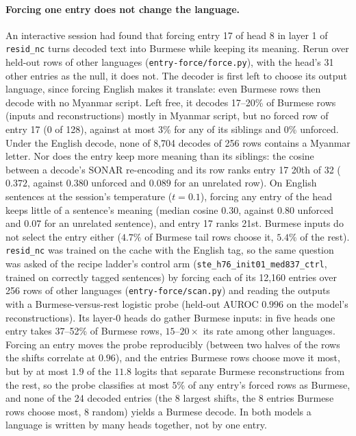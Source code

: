\paragraph{Forcing one entry does not change the language.}
\label{sec:entryforce}
An interactive session had found that forcing entry 17 of head 8 in
layer 1 of \texttt{resid\_nc} turns decoded text into Burmese while
keeping its meaning. Rerun over held-out rows of other languages
(\texttt{entry-force/force.py}), with the head's 31 other entries as the
null, it does not. The decoder is first left to choose its output
language, since forcing English makes it translate: even Burmese rows then
decode with no Myanmar script. Left free, it decodes 17--20\% of Burmese
rows (inputs and reconstructions) mostly in Myanmar script, but no forced
row of entry 17 (0 of 128), against at most 3\% for any of its siblings and
0\% unforced. Under the English decode, none of 8{,}704 decodes of 256
rows contains a Myanmar letter. Nor does the entry keep more meaning than
its siblings: the cosine between a decode's SONAR re-encoding and its row
ranks entry 17 20th of 32 ($0.372$, against $0.380$ unforced and $0.089$
for an unrelated row). On English sentences at the session's temperature
($t{=}0.1$), forcing any entry of the head keeps little of a sentence's
meaning (median cosine $0.30$, against $0.80$ unforced and $0.07$ for an
unrelated sentence), and entry 17 ranks 21st. Burmese inputs do not
select the entry either ($4.7\%$ of Burmese tail rows choose it, $5.4\%$
of the rest). \texttt{resid\_nc} was trained on the cache with the English
tag, so the same question was asked of the recipe ladder's control arm
(\texttt{ste\_h76\_init01\_med837\_ctrl}, trained on correctly tagged
sentences) by forcing each of its 12{,}160 entries over 256 rows of other
languages (\texttt{entry-force/scan.py}) and reading the outputs with a
Burmese-versus-rest logistic probe (held-out AUROC $0.996$ on the model's
reconstructions). Its layer-0 heads do gather Burmese inputs: in five
heads one entry takes 37--52\% of Burmese rows, $15$--$20{\times}$ its
rate among other languages. Forcing an entry moves the probe
reproducibly (between two halves of the rows the shifts correlate at
$0.96$), and the entries Burmese rows choose move it most, but by at most
$1.9$ of the $11.8$ logits that separate Burmese reconstructions from the
rest, so the probe classifies at most 5\% of any entry's forced rows as
Burmese, and none of
the 24 decoded entries (the 8 largest shifts, the 8 entries Burmese rows
choose most, 8 random) yields a Burmese decode. In both models a language
is written by many heads together, not by one entry.

